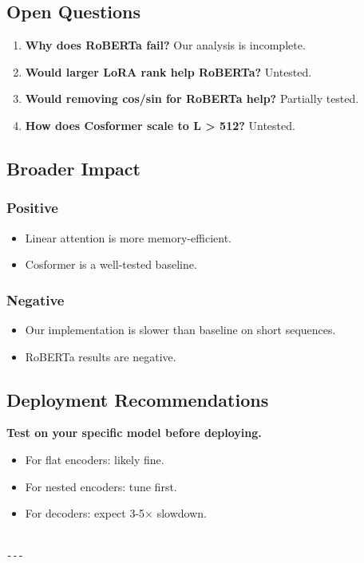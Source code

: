 \subsection{Open Questions}

\begin{enumerate}
\item \textbf{Why does RoBERTa fail?} Our analysis is incomplete.
\item \textbf{Would larger LoRA rank help RoBERTa?} Untested.
\item \textbf{Would removing cos/sin for RoBERTa help?} Partially tested.
\item \textbf{How does Cosformer scale to L \textgreater{} 512?} Untested.

\end{enumerate}
\subsection{Broader Impact}

\subsubsection{Positive}

\begin{itemize}
\item Linear attention is more memory-efficient.
\item Cosformer is a well-tested baseline.

\end{itemize}
\subsubsection{Negative}

\begin{itemize}
\item Our implementation is slower than baseline on short sequences.
\item RoBERTa results are negative.

\end{itemize}
\subsection{Deployment Recommendations}

\textbf{Test on your specific model before deploying.}
\begin{itemize}
\item For flat encoders: likely fine.
\item For nested encoders: tune first.
\item For decoders: expect 3-5$\times$ slowdown.
\end{itemize}
\begin{lstlisting}

---
\end{lstlisting}

